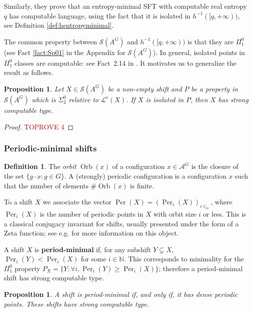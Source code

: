 \documentclass[french,american]{article}
\theoremstyle{plain}
\newtheorem{proposition}[theorem]{Proposition}
\theoremstyle{definition}
\newtheorem{definition}[theorem]{Definition}
\theoremstyle{remark}
\theoremstyle{plain}
\newcommand{\N}{\mathbb{N}}
\newcommand{\A}{\mathcal A}
\DeclareMathOperator{\Orb}{Orb}
\DeclareMathOperator{\Per}{Per}
\begin{document}
Similarly, they prove that an entropy-minimal SFT with computable
real entropy $q$ has computable language, using the fact that it is isolated in $h^{-1}([q,+\infty))$, see Definition \ref{def:hentropyminimal}.

The common property between $\mathcal{S}(A^{G})$ and $h^{-1}([q,+\infty))$
is that they are $\Pi_{1}^{0}$ (see Fact \ref{fact:Sp01}
in the Appendix for $\mathcal{S}(A^{G})$). In general, isolated points in $\Pi_1^0$ classes are computable: see Fact~2.14 in \cite{DOWNEY_MELNIKOV_2023}. It motivates us to generalize the result as follows.

\begin{proposition}
\label{prop:isolated} Let $X\in\mathcal{S}(A^{G})$ be a non-empty
shift and $P$ be a property in $\mathcal{S}(A^{G})$
which is $\Sigma_{2}^{0}$ relative to $\mathcal L^c(X)$.  If $X$ is isolated in $P$, then $X$ has strong computable
type.
\end{proposition}

\begin{proof}\textcolor{red}{TOPROVE 4}\end{proof}



\subsubsection{Periodic-minimal shifts}
\begin{definition}
The \emph{orbit} $\Orb(x)$ of a configuration $x\in\A^{G}$ is the
closure of the set $\{g\cdot x:g\in G\}$. A (strongly) periodic configuration
is a configuration $x$ such that the number of elements $\#\Orb(x)$
is finite.
\end{definition}

To a shift $X$ we associate the vector $\Per(X)=(\Per_{i}(X))_{i\in_{\N}}$,
where $\Per_{i}(X)$ is the number of periodic points in $X$ with orbit
size $i$ or less. This is a classical conjugacy invariant for shifts,
usually presented under the form of a Zeta function; see e.g. \cite{lind1996zeta}
for more information on this object.

A shift $X$ is \textbf{period-minimal} if, for any subshift $Y\subsetneq X$,
$\Per_{i}(Y)<\Per_{i}(X)$ for some $i\in\N$. This corresponds to
minimality for the $\Pi_{1}^{0}$ property $P_{X}=\{Y:\forall i,\Per_{i}(Y)\geq\Per_{i}(X)\}$;
therefore a period-minimal shift has strong computable type.
\begin{proposition}
A shift is period-minimal if, and only if, it has dense periodic points.
These shifts have strong computable type. 
\end{proposition}
\end{document}
